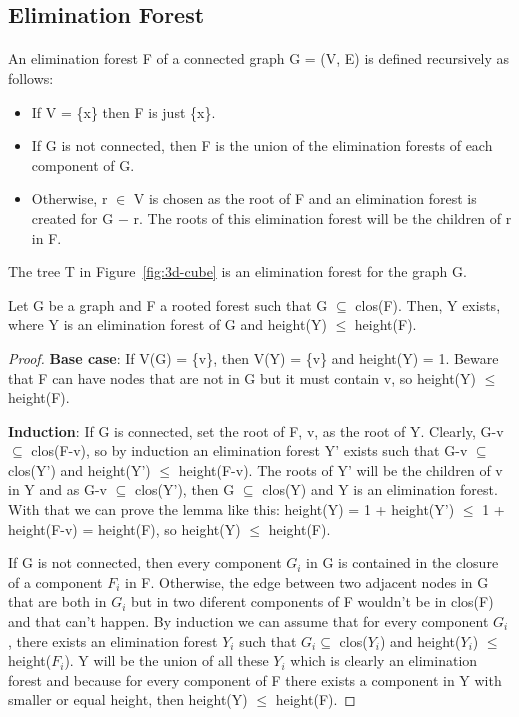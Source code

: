 \subsection{Elimination Forest}
\paragraph{}
An elimination forest F of a connected graph G = (V, E) is defined recursively as follows:
\begin{itemize}
  \item If V = \{x\} then F is just \{x\}.
  \item If G is not connected, then F is the union of the elimination forests of each component of G.
  \item Otherwise, r $\in$ V is chosen as the root of F and an elimination forest is created for G $-$ r. The roots of this elimination forest will be the children of r in F.
\end{itemize}
The tree T in Figure~\ref{fig:3d-cube} is an elimination forest for the graph G.

\begin{lemma}
\label{lema:min-ET}
Let G be a graph and F a rooted forest such that G $\subseteq$ clos(F). Then, Y exists, where Y is an elimination forest of G and height(Y) $\leq$ height(F).
\end{lemma}

\begin{proof}
  \item \textbf{Base case}: If V(G) = \{v\}, then V(Y) = \{v\} and height(Y) = 1. Beware that F can have nodes that are not in G but it must contain v, so height(Y) $\leq$ height(F).
  \item \textbf{Induction}: If G is connected, set the root of F, v, as the root of Y. Clearly, G-v $\subseteq$ clos(F-v), so by induction an elimination forest Y' exists such that G-v $\subseteq$ clos(Y') and height(Y') $\leq$ height(F-v). The roots of Y' will be the children of v in Y and as G-v $\subseteq$ clos(Y'), then G $\subseteq$ clos(Y) and Y is an elimination forest. With that we can prove the lemma like this: height(Y) = 1 + height(Y') $\leq$ 1 + height(F-v) = height(F), so height(Y) $\leq$ height(F).
  
  If G is not connected, then every component $G_i$ in G is contained in the closure of a component $F_i$ in F. Otherwise, the edge between two adjacent nodes in G that are both in $G_i$ but in two diferent components of F wouldn't be in clos(F) and that can't happen. By induction we can assume that for every component $G_i$, there exists an elimination forest $Y_i$ such that $G_i \subseteq$ clos($Y_i$) and height($Y_i$) $\leq$ height($F_i$). Y will be the union of all these $Y_i$ which is clearly an elimination forest and because for every component of F there exists a component in Y with smaller or equal height, then height(Y) $\leq$ height(F).
\end{proof}

